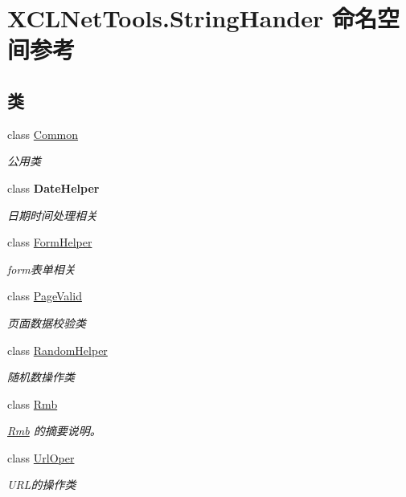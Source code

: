 \hypertarget{namespace_x_c_l_net_tools_1_1_string_hander}{}\section{X\+C\+L\+Net\+Tools.\+String\+Hander 命名空间参考}
\label{namespace_x_c_l_net_tools_1_1_string_hander}
\subsection*{类}
\begin{DoxyCompactItemize}
\item 
class \hyperlink{class_x_c_l_net_tools_1_1_string_hander_1_1_common}{Common}
\begin{DoxyCompactList}\small\item\em 公用类 \end{DoxyCompactList}\item 
class {\bfseries Date\+Helper}
\begin{DoxyCompactList}\small\item\em 日期时间处理相关 \end{DoxyCompactList}\item 
class \hyperlink{class_x_c_l_net_tools_1_1_string_hander_1_1_form_helper}{Form\+Helper}
\begin{DoxyCompactList}\small\item\em form表单相关 \end{DoxyCompactList}\item 
class \hyperlink{class_x_c_l_net_tools_1_1_string_hander_1_1_page_valid}{Page\+Valid}
\begin{DoxyCompactList}\small\item\em 页面数据校验类 \end{DoxyCompactList}\item 
class \hyperlink{class_x_c_l_net_tools_1_1_string_hander_1_1_random_helper}{Random\+Helper}
\begin{DoxyCompactList}\small\item\em 随机数操作类 \end{DoxyCompactList}\item 
class \hyperlink{class_x_c_l_net_tools_1_1_string_hander_1_1_rmb}{Rmb}
\begin{DoxyCompactList}\small\item\em \hyperlink{class_x_c_l_net_tools_1_1_string_hander_1_1_rmb}{Rmb} 的摘要说明。 \end{DoxyCompactList}\item 
class \hyperlink{class_x_c_l_net_tools_1_1_string_hander_1_1_url_oper}{Url\+Oper}
\begin{DoxyCompactList}\small\item\em U\+R\+L的操作类 \end{DoxyCompactList}\end{DoxyCompactItemize}
